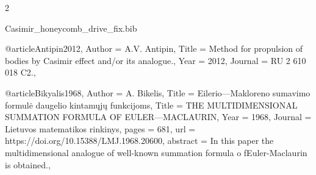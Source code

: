 \documentclass[twoside, 10pt]{article}
\def\myfilename{Casimir_honeycomb_drive_fix}
\begin{document}
\begin{multicols}{2}
\begin{filecontents}{\myfilename.bib}

@article{Antipin2012,
    Author = {A.V. Antipin},
    Title = {Method for propulsion of bodies by Casimir effect and/or its analogue.},
    Year = {2012},
    Journal = {RU 2 610 018 C2.},
}


@article{Bikyalis1968,
    Author = {A. Bikelis},
    Title = {Eilerio—Makloreno sumavimo formulė daugelio kintamųjų funkcijoms},
    Title = {THE MULTIDIMENSIONAL SUMMATION FORMULA OF EULER—MACLAURIN},
    Year = {1968},
    Journal = {Lietuvos matematikos rinkinys},
    pages = {681},
    url = {https://doi.org/10.15388/LMJ.1968.20600},
    abstract = {In this paper the multidimensional analogue of well-known summation formula o fEuler-Maclaurin is obtained.},
}



\end{filecontents}
\end{multicols}
\end{document}
